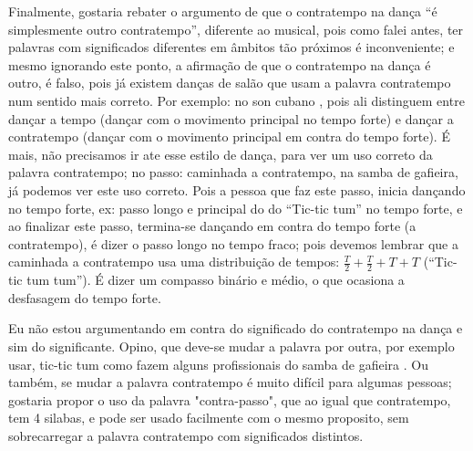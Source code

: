Finalmente, gostaria rebater o argumento de que o contratempo na dança ``é simplesmente outro contratempo'', 
diferente ao musical, pois como falei antes, 
ter palavras com significados diferentes em âmbitos tão próximos é inconveniente; 
e mesmo ignorando este ponto, a afirmação de que o contratempo na dança é outro, é falso, 
pois já existem danças de salão que usam a palavra  contratempo num sentido mais correto. 
Por exemplo: no son cubano \cite[pp. 36-37]{borges2012historia}, 
pois ali distinguem entre dançar a tempo (dançar com o movimento principal no tempo forte) 
e dançar a contratempo (dançar com o movimento principal em contra do tempo forte). 
É mais, não precisamos ir ate esse estilo de dança, para ver um uso correto da palavra contratempo; 
no passo: caminhada a contratempo, na samba de gafieira, já podemos ver este uso correto. 
Pois a pessoa que faz este passo, 
inicia dançando no tempo forte, ex: passo longo e principal do do ``Tic-tic tum'' no tempo forte, e 
ao finalizar este passo, 
termina-se dançando em contra do tempo forte (a contratempo), é dizer o passo longo no tempo fraco; 
pois devemos lembrar que a caminhada a contratempo usa uma distribuição de tempos: $\frac{T}{2}+\frac{T}{2}+T+T$  (``Tic-tic tum tum''). 
É dizer um compasso binário e médio, o que ocasiona a desfasagem do tempo forte.

Eu não estou argumentando em contra do significado do contratempo na dança
e sim do significante. 
Opino, que deve-se mudar a palavra por outra, por exemplo usar, 
tic-tic tum como fazem alguns profissionais do samba de gafieira \cite[pp. 146]{perna2002samba}.
Ou também, se mudar a palavra contratempo é muito difícil para algumas pessoas; 
gostaria propor o uso da palavra "contra-passo", que ao igual que contratempo, tem 4 silabas, 
e pode ser usado facilmente com o mesmo proposito, sem sobrecarregar a palavra contratempo com significados distintos.

